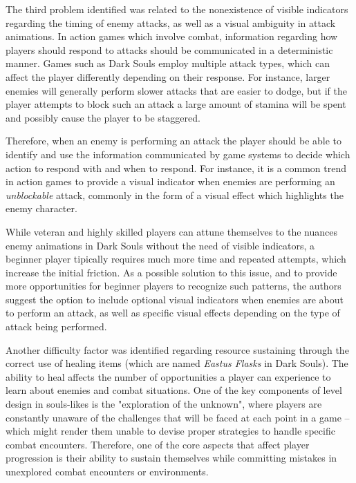 The third problem identified was related to the nonexistence of visible indicators regarding the timing of enemy attacks, as well as a visual ambiguity in attack animations. In action games which involve combat, information regarding how players should respond to attacks should be communicated in a deterministic manner. Games such as Dark Souls employ multiple attack types, which can affect the player differently depending on their response. For instance, larger enemies will generally perform slower attacks that are easier to dodge, but if the player attempts to block such an attack a large amount of stamina will be spent and possibly cause the player to be staggered.

Therefore, when an enemy is performing an attack the player should be able to identify and use the information communicated by game systems to decide which action to respond with and when to respond. For instance, it is a common trend in action games to provide a visual indicator when enemies are performing an \emph{unblockable} attack, commonly in the form of a visual effect which highlights the enemy character.

While veteran and highly skilled players can attune themselves to the nuances enemy animations in Dark Souls without the need of visible indicators, a beginner player tipically requires much more time and repeated attempts, which increase the initial friction. As a possible solution to this issue, and to provide more opportunities for beginner players to recognize such patterns, the authors suggest the option to include optional visual indicators when enemies are about to perform an attack, as well as specific visual effects depending on the type of attack being performed.  

Another difficulty factor was identified regarding resource sustaining through the correct use of healing items (which are named \emph{Eastus Flasks} in Dark Souls). The ability to heal affects the number of opportunities a player can experience to learn about enemies and combat situations. One of the key components of level design in souls-likes is the "exploration of the unknown", where players are constantly unaware of the challenges that will be faced at each point in a game -- which might render them unable to devise proper strategies to handle specific combat encounters. Therefore, one of the core aspects that affect player progression is their ability to sustain themselves while committing mistakes in unexplored combat encounters or environments.

